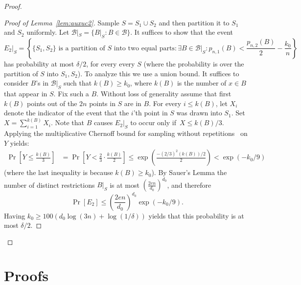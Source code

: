 \documentclass{article}
\def\B{{\mathcal B}}
\newcommand{\samp}{S}
\begin{document}
\begin{proof}
\begin{proof}[Proof of Lemma~\ref{lem:auxuc2}]
Sample $\samp=\samp_1\cup \samp_2$ and 
then partition it to $\samp_1$ and $\samp_2$ uniformly.
Let $\B|_{\samp} = \{B|_{\samp} : B\in\B\}$.
It suffices to show that the event
\[E_2|_{\samp} = 
\left\{ \{S_1,S_2\}\text{ is a partition of $S$ into two equal parts} :
\exists {B\in\B|_{\samp}}:
p_{n,1}(B) < \frac{p_{n,2}(B)}{2} - \frac{k_0}{n}
  \right\}
\]
has probability at most $\delta/2$, for every every $\samp$ 
(where the probability is over the partition of $\samp$ into $\samp_1,\samp_2$).
To analyze this we use a union bound. 
It suffices to consider $B$'s in $\B|_{\samp}$ such that $k(B) \geq k_0$,
where $k(B)$ is the number of $x\in B$ that appear in $S$.
Fix such a $B$.
Without loss of generality assume that
first $k(B)$ points out of the $2n$
points in $S$ are in $B$. 
For every $i\leq k(B)$,
let $X_i$ denote the indicator of the event
that the $i$'th point in $S$ was drawn into $S_1$.
Set~$X=\sum_{i=1}^{k(B)}X_i$.
Note that $B$ causes $E_2|_{\samp}$ to occur only if~$X\leq k(B)/3$.
Applying the multiplicative Chernoff bound for sampling without repetitions~\cite{H63} on $Y$ yields:
\begin{align*}
\Pr\left[Y\leq \frac{k(B)}{3}\right]&=\Pr\left[Y < \frac{2}{3}\cdot\frac{k(B)}{2}\right]\leq
\exp\left(\frac{-(2/3)^2\left(k(B)\right)/2}{2}\right) < \exp(-k_0/9)
\end{align*}
(where the last inequality is because $k(B) \geq k_0$).
By Sauer's Lemma
the number of distinct restrictions $B|_S$ is at most $\left(\frac{2en}{d_0}\right)^{d_0}$, and therefore 
\[\Pr[E_2]\leq \left(\frac{2en}{d_0}\right)^{d_0}  \exp(-k_0/9).\]
Having $k_0\geq 100\left(d_0 \log(3n) + \log(1/\delta)\right)$ yields
that this probability is at most $\delta/2$.
\end{proof}
\end{proof}







\appendix

\section{Proofs}
\end{document}
